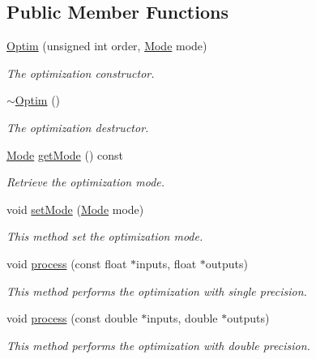 \subsection*{Public Member Functions}
\begin{DoxyCompactItemize}
\item 
\hyperlink{class_hoa2_d_1_1_optim_a5e11da74b3e87ad15db6538d31eb3628}{Optim} (unsigned int order, \hyperlink{class_hoa2_d_1_1_optim_ae40f22368cb55699cf19729e37c0aff3}{Mode} mode)
\begin{DoxyCompactList}\small\item\em The optimization constructor. \end{DoxyCompactList}\item 
\hyperlink{class_hoa2_d_1_1_optim_a71b6d88873b054944db6efd2713bf8d3}{$\sim$\-Optim} ()
\begin{DoxyCompactList}\small\item\em The optimization destructor. \end{DoxyCompactList}\item 
\hyperlink{class_hoa2_d_1_1_optim_ae40f22368cb55699cf19729e37c0aff3}{Mode} \hyperlink{class_hoa2_d_1_1_optim_ab75c7150c5918ed05219212b426aa04b}{get\-Mode} () const 
\begin{DoxyCompactList}\small\item\em Retrieve the optimization mode. \end{DoxyCompactList}\item 
void \hyperlink{class_hoa2_d_1_1_optim_a2ea2227817c133aeaf2732880d8214ce}{set\-Mode} (\hyperlink{class_hoa2_d_1_1_optim_ae40f22368cb55699cf19729e37c0aff3}{Mode} mode)
\begin{DoxyCompactList}\small\item\em This method set the optimization mode. \end{DoxyCompactList}\item 
void \hyperlink{class_hoa2_d_1_1_optim_afca15242cbca4fefe08c6f17d2b42241}{process} (const float $\ast$inputs, float $\ast$outputs)
\begin{DoxyCompactList}\small\item\em This method performs the optimization with single precision. \end{DoxyCompactList}\item 
void \hyperlink{class_hoa2_d_1_1_optim_ac0c905a79204c921568952c787376120}{process} (const double $\ast$inputs, double $\ast$outputs)
\begin{DoxyCompactList}\small\item\em This method performs the optimization with double precision. \end{DoxyCompactList}\end{DoxyCompactItemize}


